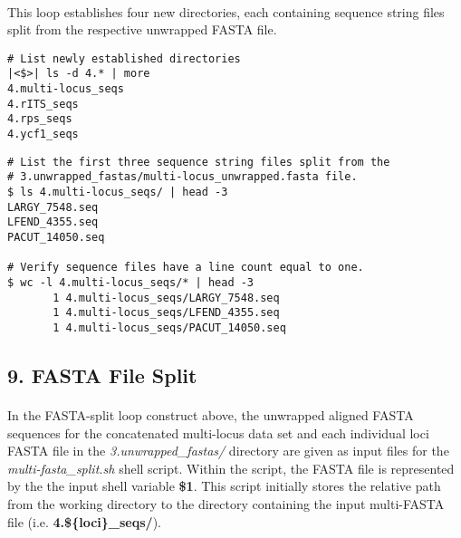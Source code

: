 \vspace*{30pt}

\paragraph{} This loop establishes four new directories, each containing sequence string files split from the respective unwrapped FASTA file.

\vspace*{30pt}

\begin{lstlisting}[caption={Verify \textit{multi-fasta\_split.sh} script execution}]
# List newly established directories
|<$>| ls -d 4.* | more
4.multi-locus_seqs
4.rITS_seqs
4.rps_seqs
4.ycf1_seqs
\end{lstlisting}

\clearpage

\setcounter{lstlisting}{17}
\begin{lstlisting}[caption={Continued}]
# List the first three sequence string files split from the
# 3.unwrapped_fastas/multi-locus_unwrapped.fasta file.
$ ls 4.multi-locus_seqs/ | head -3
LARGY_7548.seq
LFEND_4355.seq
PACUT_14050.seq

# Verify sequence files have a line count equal to one.
$ wc -l 4.multi-locus_seqs/* | head -3
       1 4.multi-locus_seqs/LARGY_7548.seq
       1 4.multi-locus_seqs/LFEND_4355.seq
       1 4.multi-locus_seqs/PACUT_14050.seq
\end{lstlisting}

\vspace*{30pt}

\subsection*{9. FASTA File Split}

\paragraph{} In the FASTA-split loop construct above, the unwrapped aligned FASTA sequences for the concatenated multi-locus data set and each individual loci FASTA file in the \textit{3.unwrapped\_fastas/} directory are given as input files for the \textit{multi-fasta\_split.sh} shell script.  Within the script, the FASTA file is represented by the the input shell variable \textbf{\$1}.  This script initially stores the relative path from the working directory to the directory containing the input multi-FASTA file (i.e. \textbf{4.\$\{loci\}\_seqs/}).  

